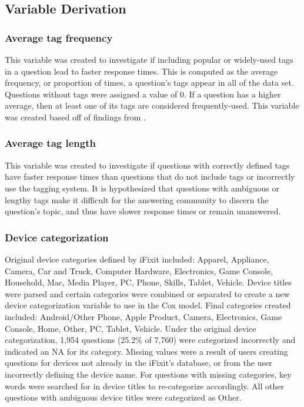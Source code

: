 \documentclass[preprint]{elsarticle}
\begin{document}

\subsection{Variable Derivation}

\subsubsection{Average tag frequency}

This variable was created to investigate if including popular or widely-used tags in a question lead to faster response times. This is computed as the average frequency, or proportion of times, a question's tags appear in all of the data set. Questions without tags were assigned a value of 0.  If a question has a higher average, then at least one of its tags are considered frequently-used. This variable was created based off of findings from \cite{Bhat2014}. 


\subsubsection{Average tag length}

This variable was created to investigate if questions with correctly defined tags have faster response times than questions that do not include tags or incorrectly use the tagging system. It is hypothesized that questions with ambiguous or lengthy tags make it difficult for the answering community to discern the question's topic, and thus have slower response times or remain unanswered. 


\subsubsection{Device categorization}

Original device categories defined by iFixit included: Apparel, Appliance, Camera, Car and Truck, Computer Hardware, Electronics, Game Console, Household, Mac, Media Player, PC, Phone, Skills, Tablet, Vehicle. Device titles were parsed and certain categories were combined or separated to create a new device categorization variable to use in the Cox model. Final categories created included: Android/Other Phone, Apple Product, Camera, Electronics, Game Console, Home, Other, PC, Tablet, Vehicle. Under the original device categorization, 1,954 questions (25.2\% of 7,760) were categorized incorrectly and indicated an NA for its category. Missing values were a result of users creating questions for devices not already in the iFixit's database, or from the user incorrectly defining the device name. For questions with missing categories, key words were searched for in device titles to re-categorize accordingly. All other questions with ambiguous device titles were categorized as Other. 
\end{document}
